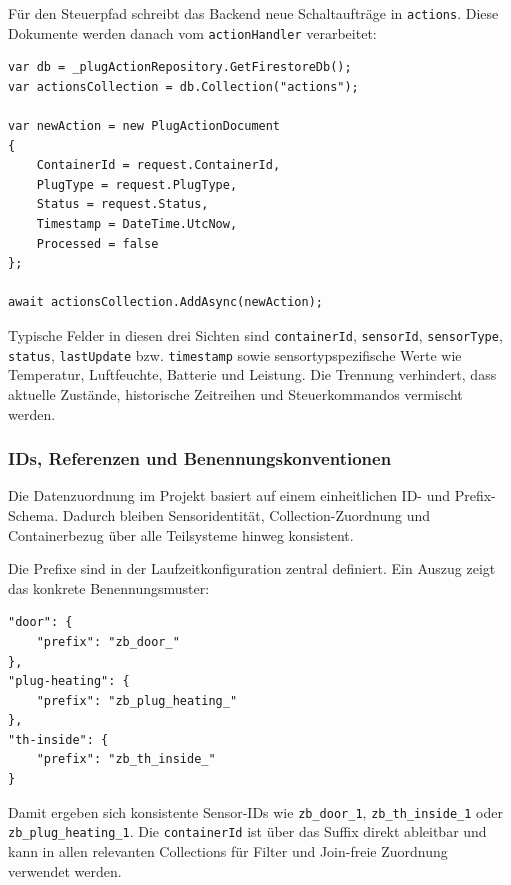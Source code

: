 Für den Steuerpfad schreibt das Backend neue Schaltaufträge in \texttt{actions}. Diese Dokumente werden danach vom \texttt{actionHandler} verarbeitet:

\begin{lstlisting}[language={[Sharp]C},caption={Erzeugung eines Aktionsdokuments in actions},label={lst:db:actions:add},basicstyle=\ttfamily\small,breaklines=true,breakatwhitespace=false,columns=fullflexible]
var db = _plugActionRepository.GetFirestoreDb();
var actionsCollection = db.Collection("actions");

var newAction = new PlugActionDocument
{
    ContainerId = request.ContainerId,
    PlugType = request.PlugType,
    Status = request.Status,
    Timestamp = DateTime.UtcNow,
    Processed = false
};

await actionsCollection.AddAsync(newAction);
\end{lstlisting}

Typische Felder in diesen drei Sichten sind \texttt{containerId}, \texttt{sensorId}, \texttt{sensorType}, \texttt{status}, \texttt{lastUpdate} bzw. \texttt{timestamp} sowie sensortypspezifische Werte wie Temperatur, Luftfeuchte, Batterie und Leistung. Die Trennung verhindert, dass aktuelle Zustände, historische Zeitreihen und Steuerkommandos vermischt werden.

\subsubsection{IDs, Referenzen und Benennungskonventionen}

Die Datenzuordnung im Projekt basiert auf einem einheitlichen ID- und Prefix-Schema. Dadurch bleiben Sensoridentität, Collection-Zuordnung und Containerbezug über alle Teilsysteme hinweg konsistent.

Die Prefixe sind in der Laufzeitkonfiguration zentral definiert. Ein Auszug zeigt das konkrete Benennungsmuster:

\begin{lstlisting}[caption={Prefix-Konventionen in der Sensor-Konfiguration},label={lst:db:ids:prefixes},basicstyle=\ttfamily\small]
"door": {
    "prefix": "zb_door_"
},
"plug-heating": {
    "prefix": "zb_plug_heating_"
},
"th-inside": {
    "prefix": "zb_th_inside_"
}
\end{lstlisting}

Damit ergeben sich konsistente Sensor-IDs wie \texttt{zb\_door\_1}, \texttt{zb\_th\_inside\_1} oder \texttt{zb\_plug\_heating\_1}. Die \texttt{containerId} ist über das Suffix direkt ableitbar und kann in allen relevanten Collections für Filter und Join-freie Zuordnung verwendet werden.


